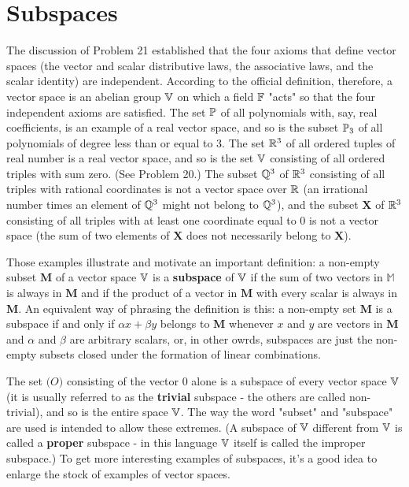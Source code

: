 \section{Subspaces}

The discussion of Problem 21 established that the four axioms that define vector spaces (the vector and scalar distributive laws, the associative laws, and the scalar identity) are independent. According to the official definition, therefore, a vector space is an abelian group $\V$ on which a field $\F$ "acts" so that the four independent axioms are satisfied. The set $\P$ of all polynomials with, say, real coefficients, is an example of a real vector space, and so is the subset $\P_3$ of all polynomials of degree less than or equal to 3. The set $\R^3$ of all ordered tuples of real number is a real vector space, and so is the set $\V$ consisting of all ordered triples with sum zero. (See Problem 20.) The subset $\Q^3$ of $\R^3$ consisting of all triples with rational coordinates is not a vector space over $\R$ (an irrational number times an element of $\Q^3$ might not belong to $\Q^3$), and the subset $\mathbf{X}$ of $\R^3$ consisting of all triples with at least one coordinate equal to $0$ is not a vector space (the sum of two elements of $\mathbf{X}$ does not necessarily belong to $\mathbf{X}$).

Those examples illustrate and motivate an important definition: a non-empty subset $\mathbf{M}$ of a vector space $\V$ is a \textbf{subspace} of $\V$ if the sum of two vectors in $\mathbb{M}$ is always in $\mathbf{M}$ and if the product of a vector in $\mathbf{M}$ with every scalar is always in $\mathbf{M}$. An equivalent way of phrasing the definition is this: a non-empty set $\mathbf{M}$ is a subspace if and only if $\alpha x + \beta y$ belongs to $\mathbf{M}$ whenever $x$ and $y$ are vectors in $\mathbf{M}$ and $\alpha$ and $\beta$ are arbitrary scalars, or, in other owrds, subspaces are just the non-empty subsets closed under the formation of linear combinations.

The set $\mathbf(O)$ consisting of the vector 0 alone is a subspace of every vector space $\V$ (it is usually referred to as the \textbf{trivial} subspace - the others are called non-trivial), and so is the entire space $\V$. The way the word "subset" and "subspace" are used is intended to allow these extremes. (A subspace of $\V$ different from $\V$ is called a \textbf{proper} subspace - in this language $\V$ itself is called the improper subspace.) To get more interesting examples of subspaces, it's a good idea to enlarge the stock of examples of vector spaces.


